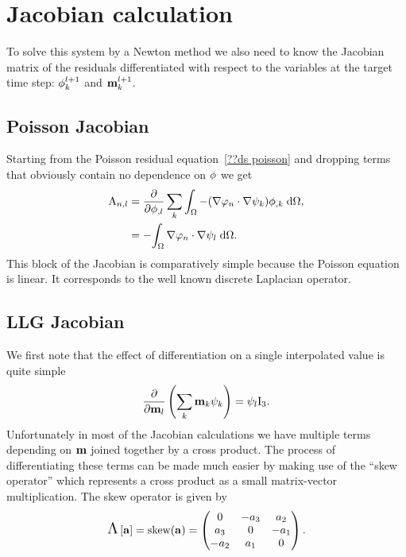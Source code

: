 \section{Jacobian calculation}
\label{sec:llg-jacobian-calculation}

To solve this system by a Newton method we also need to know the Jacobian matrix of the residuals differentiated with respect to the variables at the target time step: $\phi_{k}^{l+1}$ and $\mathbf{m}_{k}^{l+1}$.

\subsection{Poisson Jacobian}
\label{sec:poisson-jacobian}

Starting from the Poisson residual equation~\eqref{??ds poisson} and dropping terms that obviously contain no dependence on $\phi$ we get
\begin{equation}
  \begin{aligned}
    \label{eq:poisson-jacobian}
    \mathrm{A}_{n,l} &= \frac{\partial }{\partial \phi_{,l}} \sum_k {\int_{\Omega}  -(\nabla \varphi_n \cdot \nabla \psi_k) \phi_{,k} {\; \text{d}} {\Omega}}, \\
    &= -{\int_{\Omega} \nabla \varphi_n \cdot \nabla \psi_l {\; \text{d}} {\Omega}}.
  \end{aligned}
\end{equation}
This block of the Jacobian is comparatively simple because the Poisson equation is linear. 
It corresponds to the well known discrete Laplacian operator\cite{HowardElmanDavidSilvester2006}.


\subsection{LLG Jacobian}
\label{sec:llg-jacobian}

We first note that the effect of differentiation on a single interpolated value is quite simple
\begin{equation}
  \frac{\partial }{\partial \mathbf{m}_l} \left( \sum_k \mathbf{m}_k {\psi_k} \right) = \psi_l \text{I}_3.
\end{equation}
Unfortunately in most of the Jacobian calculations we have multiple terms depending on $\mathbf{m}$ joined together by a cross product.
The process of differentiating these terms can be made much easier by making use of the ``skew operator'' which represents a cross product as a small matrix-vector multiplication.
The skew operator is given by
\begin{equation}
  \text{\Large{$\Lambda$}}\left[ {\mathbf{a}} \right] = \text{skew}({\mathbf{a}}) =
  \begin{pmatrix}
    0 & -a_3 & a_2 \\
    a_3 & 0 & -a_1 \\
    -a_2 & a_1 & 0
  \end{pmatrix}.
  \label{eqn:skew}
\end{equation}

